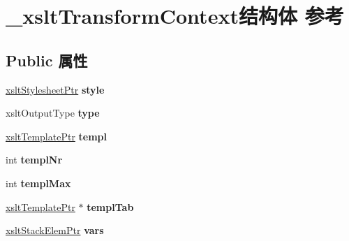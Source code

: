 \hypertarget{struct__xslt_transform_context}{}\section{\+\_\+xslt\+Transform\+Context结构体 参考}
\label{struct__xslt_transform_context}
\subsection*{Public 属性}
\begin{DoxyCompactItemize}
\item 
\mbox{\label{struct__xslt_transform_context_ab51f58eda2fe4d7f742eec6f855b5cc7}} 
\hyperlink{struct__xslt_stylesheet}{xslt\+Stylesheet\+Ptr} {\bfseries style}
\item 
\mbox{\label{struct__xslt_transform_context_a21c07e04addcb7530a51731500b3a288}} 
xslt\+Output\+Type {\bfseries type}
\item 
\mbox{\label{struct__xslt_transform_context_a2cdf2c4381031d542cbb4af93fad47dc}} 
\hyperlink{struct__xslt_template}{xslt\+Template\+Ptr} {\bfseries templ}
\item 
\mbox{\label{struct__xslt_transform_context_a04f1f982c418a282293dba238df59a88}} 
int {\bfseries templ\+Nr}
\item 
\mbox{\label{struct__xslt_transform_context_a1eae290d351fbe592fc6d13b7c5c26a5}} 
int {\bfseries templ\+Max}
\item 
\mbox{\label{struct__xslt_transform_context_a017ea4adbaac3b82abfc836ceccc4440}} 
\hyperlink{struct__xslt_template}{xslt\+Template\+Ptr} $\ast$ {\bfseries templ\+Tab}
\item 
\mbox{\label{struct__xslt_transform_context_a1d8459e2fd82830640b0ca0a5b9d346d}} 
\hyperlink{struct__xslt_stack_elem}{xslt\+Stack\+Elem\+Ptr} {\bfseries vars}
\item 
\mbox{\label{struct__xslt_transform_context_a9a7d329f966e39d778c623fb5b0fe73e}} 

\end{DoxyCompactItemize}
